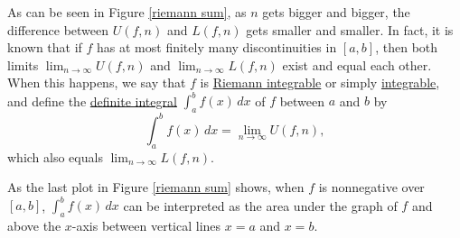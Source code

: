 \documentclass[12pt,letterpaper]{book}
\numberwithin{equation}{section}
\theoremstyle{definition}
\begin{document}
As can be seen in Figure \ref{riemann sum}, as $n$ gets bigger and bigger, the difference between $U(f,n)$ and $L(f,n)$ gets smaller and smaller. In fact, it is known that if $f$ has at most finitely many discontinuities in $[a,b]$, then both limits $\displaystyle{\lim_{n\to \infty}U(f,n)}$ and $\displaystyle{\lim_{n\to \infty}L(f,n)}$ exist and equal each other. When this happens, we say that $f$ is \underline{Riemann integrable} or simply \underline{integrable}, and define the \underline{definite integral} $\displaystyle{\int_a^b f(x)\,dx}$ of $f$ between $a$ and $b$ by
$$\int_a^b f(x)\,dx=\lim_{n\to \infty}U(f,n),$$
which also equals $\displaystyle{\lim_{n\to \infty}L(f,n)}$.

As the last plot in Figure \ref{riemann sum} shows, when $f$ is nonnegative over $[a,b]$, $\displaystyle{\int_a^b f(x)\,dx}$ can be interpreted as the area under the graph of $f$ and above the $x$-axis between vertical lines $x=a$ and $x=b$.

\end{document}
